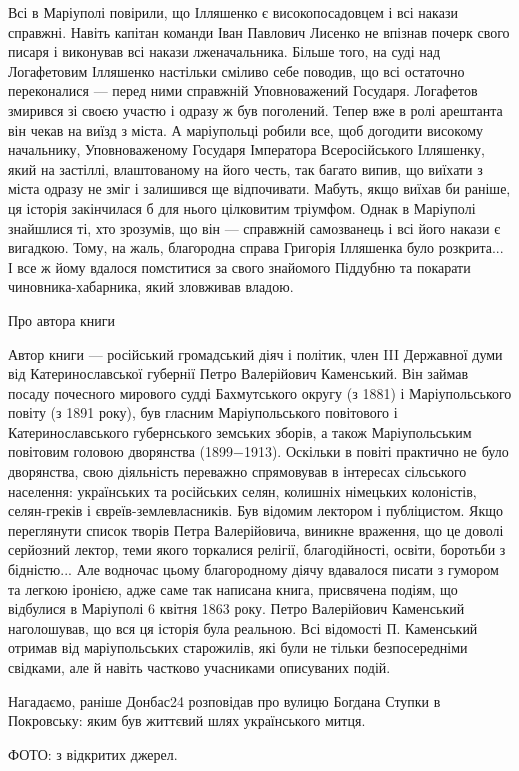 Всі в Маріуполі повірили, що Ілляшенко є високопосадовцем і всі накази
справжні. Навіть капітан команди Іван Павлович Лисенко не впізнав почерк свого
писаря і виконував всі накази лженачальника. Більше того, на суді над
Логафетовим Ілляшенко настільки сміливо себе поводив, що всі остаточно
переконалися — перед ними справжній Уповноважений Государя. Логафетов змирився
зі своєю участю і одразу ж був поголений. Тепер вже в ролі арештанта він чекав
на виїзд з міста. А маріупольці робили все, щоб догодити високому начальнику,
Уповноваженому Государя Імператора Всеросійського Ілляшенку, який на застіллі,
влаштованому на його честь, так багато випив, що виїхати з міста одразу не зміг
і залишився ще відпочивати. Мабуть, якщо виїхав би раніше, ця історія
закінчилася б для нього цілковитим тріумфом. Однак в Маріуполі знайшлися ті,
хто зрозумів, що він — справжній самозванець і всі його накази є вигадкою.
Тому, на жаль, благородна справа Григорія Ілляшенка було розкрита... І все ж йому
вдалося помститися за свого знайомого Піддубню та покарати чиновника-хабарника,
який зловживав владою.

Про автора книги 

Автор книги — російський громадський діяч і політик, член III Державної думи
від Катеринославської губернії Петро Валерійович Каменський. Він займав посаду
почесного мирового судді Бахмутського округу (з 1881) і Маріупольського повіту
(з 1891 року), був гласним Маріупольського повітового і Катеринославського
губернського земських зборів, а також Маріупольським повітовим головою
дворянства (1899−1913). Оскільки в повіті практично не було дворянства, свою
діяльність переважно спрямовував в інтересах сільського населення: українських
та російських селян, колишніх німецьких колоністів, селян-греків і
євреїв-землевласників. Був відомим лектором і публіцистом. Якщо переглянути
список творів Петра Валерійовича, виникне враження, що це доволі серйозний
лектор, теми якого торкалися релігії, благодійності, освіти, боротьби з
бідністю... Але водночас цьому благородному діячу вдавалося писати з гумором та
легкою іронією, адже саме так написана книга, присвячена подіям, що відбулися в
Маріуполі 6 квітня 1863 року. Петро Валерійович Каменський наголошував, що вся
ця історія була реальною. Всі відомості П. Каменський отримав від
маріупольських старожилів, які були не тільки безпосередніми свідками, але й
навіть частково учасниками описуваних подій.

Нагадаємо, раніше Донбас24 розповідав про вулицю Богдана Ступки в Покровську: яким був життєвий шлях українського митця.

ФОТО: з відкритих джерел.
